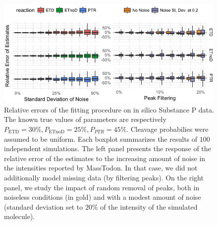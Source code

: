 \documentclass{llncs}
\begin{document}
        \begin{figure}[h]
                \center
                \includegraphics[width=\textwidth]{kokos.png}
                \caption{ Relative errors of the fitting procedure on in silico Substance P data. The known true values of parameters are respectively $P_\text{ETD}=30\%, P_\text{ETnoD}= 25\%, P_{PTR}= 45\%$. Cleavage probabilies were assumed to be uniform. Each boxplot summarizes the results of $100$ independent simulations. The left panel presents the response of the relative error of the estimates to the increasing amount of noise in the intensities reported by MassTodon. In that case, we did not additionally model missing data (by filtering peaks). On the right panel, we study the impact of random removal of peaks, both in noiseless conditions (in gold) and with a modest amount of noise (standard deviation set to $20\%$ of the intensity of the simulated molecule).
                }\label{fig::kokos}
        \end{figure}
\end{document}
